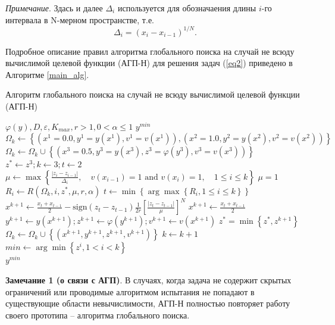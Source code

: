 \documentclass[a4paper,12pt,russian]{article}
\begin{document}
\textit{Примечание}. Здась и далее $\Delta_i$ используется для обозначаения длины $i$-го интервала в N-мерном пространстве, т.е.
\[
\Delta _i= (x_i-x_{i-1})^{1/N}.
\]

Подробное описание правил алгоритма глобального поиска на случай не всюду вычислимой целевой функции (АГП-Н)  для решения задач (\ref{eq2}) приведено в Алгоритме \ref{main_alg}.

\begin{algorithm}
\caption{Алгоритм глобального поиска на случай не всюду вычислимой целевой функции (АГП-Н)}\label{main_alg}
\begin{algorithmic}[1]
\Require $\varphi(y), D, \varepsilon, K_{max}, r >1, 0 < \alpha \leq 1$
\Ensure $y^{min}$
\State $\Omega_k \gets \left\{(x^1 = 0.0, y^1 = y(x^1), v^1=v(x^1)), (x^2 = 1.0, y^2 = y(x^2), v^2 = v(x^2))\right\}$
\State $\Omega_k \gets \Omega_k \cup \left\{(x^3 = 0.5, y^3 = y(x^3), z^3 = \varphi(y^3), v^3 = v(x^3))\right\}$
\State $z^* \gets z^3; k \gets 3; t \gets 2$
    \State $\mu \gets \max\left\{ \frac{|z_i-z_{i-1}|}{\Delta _i},\quad v(x_{i-1}) = 1 \text{ and } v(x_i) = 1, \quad 1 \leq i \leq k  \right\}$
       \State $\mu = 1$
   \EndIf
        \State $R_i \gets R(\Omega_k, i, z^*, \mu, r, \alpha)$
    \EndFor
    \State $t \gets \min \left\{\arg\max \left\{ R_i, 1 \leq i \leq k \right\}\right\}$
        \State $x^{k+1} \gets \frac {x_t+x_{t-1}}{2} -  \text{sign} {(z_t-z_{t-1})} \frac{1}{2r} \left[\frac {{|z_t-z_{t-1}|}}{\mu} \right]^N$
    \Else
        \State $x^{k+1} \gets \frac {x_t+x_{t-1}}{2}$
    \EndIf
    \State $y^{k + 1} \gets y(x^{k + 1}); z^{k + 1} \gets \varphi(y^{k + 1}); v^{k+1} \gets v(x^{k+1})$
    \State $z^* = \min \left \{z^*, z^{k+1}\right \}$
    \State$\Omega_k \gets \Omega_k \cup \left\{(x^{k+1}, y^{k+1}, z^{k+1}, v^{k+1})\right\}$
    \State $k \gets k + 1$
\EndWhile
\State $min \gets \arg \min \left\{ z^i, 1 < i < k \right\}$\\
\Return $y^{min}$
\end{algorithmic}
\end{algorithm}

\textbf{Замечание 1 (о связи с АГП)}. В случаях, когда задача не содержит скрытых ограничений или проводимые алгоритмом испытания не попадают в существующие области невычислимости, АГП-Н полностью повторяет работу своего прототипа -- алгоритма глобального поиска.
\end{document}
